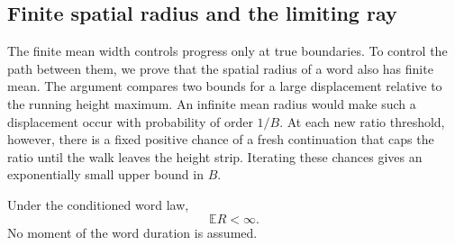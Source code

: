 \subsection{Finite spatial radius and the limiting ray}

The finite mean width controls progress only at true boundaries. To
control the path between them, we prove that the spatial radius of a
word also has finite mean. The argument compares two bounds for a
large displacement relative to the running height maximum. An infinite
mean radius would make such a displacement occur with probability of
order $1/B$. At each new ratio threshold, however, there is a fixed
positive chance of a fresh continuation that caps the ratio until the
walk leaves the height strip. Iterating these chances gives an
exponentially small upper bound in $B$.

\begin{proposition}\label{geom-radius}
Under the conditioned word law,
\[
\mathbb E R<\infty. \tag{1}\label{eq:1}
\]
No moment of the word duration is assumed.
\end{proposition}

